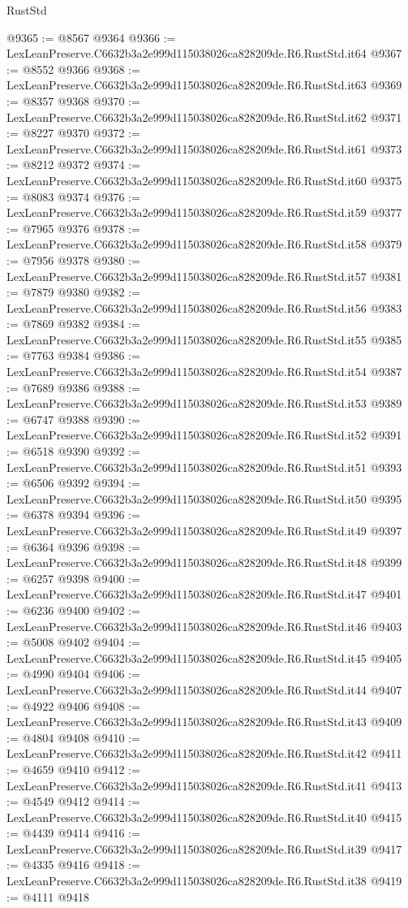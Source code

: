 \begin{lexlean}{RustStd}
\begin{coremodule}
@9365 := @8567 @9364
@9366 := LexLeanPreserve.C6632b3a2e999d115038026ca828209de.R6.RustStd.it64
@9367 := @8552 @9366
@9368 := LexLeanPreserve.C6632b3a2e999d115038026ca828209de.R6.RustStd.it63
@9369 := @8357 @9368
@9370 := LexLeanPreserve.C6632b3a2e999d115038026ca828209de.R6.RustStd.it62
@9371 := @8227 @9370
@9372 := LexLeanPreserve.C6632b3a2e999d115038026ca828209de.R6.RustStd.it61
@9373 := @8212 @9372
@9374 := LexLeanPreserve.C6632b3a2e999d115038026ca828209de.R6.RustStd.it60
@9375 := @8083 @9374
@9376 := LexLeanPreserve.C6632b3a2e999d115038026ca828209de.R6.RustStd.it59
@9377 := @7965 @9376
@9378 := LexLeanPreserve.C6632b3a2e999d115038026ca828209de.R6.RustStd.it58
@9379 := @7956 @9378
@9380 := LexLeanPreserve.C6632b3a2e999d115038026ca828209de.R6.RustStd.it57
@9381 := @7879 @9380
@9382 := LexLeanPreserve.C6632b3a2e999d115038026ca828209de.R6.RustStd.it56
@9383 := @7869 @9382
@9384 := LexLeanPreserve.C6632b3a2e999d115038026ca828209de.R6.RustStd.it55
@9385 := @7763 @9384
@9386 := LexLeanPreserve.C6632b3a2e999d115038026ca828209de.R6.RustStd.it54
@9387 := @7689 @9386
@9388 := LexLeanPreserve.C6632b3a2e999d115038026ca828209de.R6.RustStd.it53
@9389 := @6747 @9388
@9390 := LexLeanPreserve.C6632b3a2e999d115038026ca828209de.R6.RustStd.it52
@9391 := @6518 @9390
@9392 := LexLeanPreserve.C6632b3a2e999d115038026ca828209de.R6.RustStd.it51
@9393 := @6506 @9392
@9394 := LexLeanPreserve.C6632b3a2e999d115038026ca828209de.R6.RustStd.it50
@9395 := @6378 @9394
@9396 := LexLeanPreserve.C6632b3a2e999d115038026ca828209de.R6.RustStd.it49
@9397 := @6364 @9396
@9398 := LexLeanPreserve.C6632b3a2e999d115038026ca828209de.R6.RustStd.it48
@9399 := @6257 @9398
@9400 := LexLeanPreserve.C6632b3a2e999d115038026ca828209de.R6.RustStd.it47
@9401 := @6236 @9400
@9402 := LexLeanPreserve.C6632b3a2e999d115038026ca828209de.R6.RustStd.it46
@9403 := @5008 @9402
@9404 := LexLeanPreserve.C6632b3a2e999d115038026ca828209de.R6.RustStd.it45
@9405 := @4990 @9404
@9406 := LexLeanPreserve.C6632b3a2e999d115038026ca828209de.R6.RustStd.it44
@9407 := @4922 @9406
@9408 := LexLeanPreserve.C6632b3a2e999d115038026ca828209de.R6.RustStd.it43
@9409 := @4804 @9408
@9410 := LexLeanPreserve.C6632b3a2e999d115038026ca828209de.R6.RustStd.it42
@9411 := @4659 @9410
@9412 := LexLeanPreserve.C6632b3a2e999d115038026ca828209de.R6.RustStd.it41
@9413 := @4549 @9412
@9414 := LexLeanPreserve.C6632b3a2e999d115038026ca828209de.R6.RustStd.it40
@9415 := @4439 @9414
@9416 := LexLeanPreserve.C6632b3a2e999d115038026ca828209de.R6.RustStd.it39
@9417 := @4335 @9416
@9418 := LexLeanPreserve.C6632b3a2e999d115038026ca828209de.R6.RustStd.it38
@9419 := @4111 @9418

\end{coremodule}
\end{lexlean}

